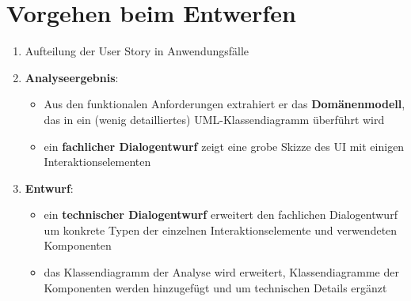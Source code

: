 \section{Vorgehen beim Entwerfen}

\begin{tcolorbox}[title=Vorgehen beim Entwerfen]
    \begin{enumerate}
        \item Aufteilung der User Story in Anwendungsfälle
        \item \textbf{Analyseergebnis}:
        \begin{itemize}
            \item  Aus den funktionalen Anforderungen extrahiert er das \textbf{Domänenmodell}, das in ein (wenig detailliertes) UML-Klassendiagramm überführt wird
            \item  ein \textbf{fachlicher Dialogentwurf} zeigt eine grobe Skizze des UI mit einigen Interaktionselementen
        \end{itemize}
        \item \textbf{Entwurf}:
        \begin{itemize}
            \item ein \textbf{technischer Dialogentwurf} erweitert den fachlichen Dialogentwurf um konkrete Typen der einzelnen Interaktionselemente und verwendeten Komponenten
            \item das Klassendiagramm der Analyse wird erweitert, Klassendiagramme der Komponenten werden hinzugefügt und um technischen Details ergänzt
        \end{itemize}
    \end{enumerate}
\end{tcolorbox}